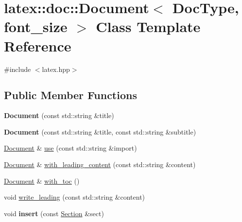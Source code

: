 \hypertarget{classlatex_1_1doc_1_1Document}{\section{latex\-:\-:doc\-:\-:Document$<$ Doc\-Type, font\-\_\-size $>$ Class Template Reference}
\label{classlatex_1_1doc_1_1Document}
}


{\ttfamily \#include $<$latex.\-hpp$>$}

\subsection*{Public Member Functions}
\begin{DoxyCompactItemize}
\item 
\hypertarget{classlatex_1_1doc_1_1Document_abe9dfc667f859b4d5a9b70db123f8de2}{{\bfseries Document} (const std\-::string \&title)}\label{classlatex_1_1doc_1_1Document_abe9dfc667f859b4d5a9b70db123f8de2}

\item 
\hypertarget{classlatex_1_1doc_1_1Document_a9ff60fad527ea2468379e753b8b97ca8}{{\bfseries Document} (const std\-::string \&title, const std\-::string \&subtitle)}\label{classlatex_1_1doc_1_1Document_a9ff60fad527ea2468379e753b8b97ca8}

\item 
\hyperlink{classlatex_1_1doc_1_1Document}{Document} \& \hyperlink{classlatex_1_1doc_1_1Document_a42ec00b493c10efbdc26fa819ed2afaa}{use} (const std\-::string \&import)
\item 
\hyperlink{classlatex_1_1doc_1_1Document}{Document} \& \hyperlink{classlatex_1_1doc_1_1Document_a00e011c7d8b95bf6ca19b8d84f952d9c}{with\-\_\-leading\-\_\-content} (const std\-::string \&content)
\item 
\hyperlink{classlatex_1_1doc_1_1Document}{Document} \& \hyperlink{classlatex_1_1doc_1_1Document_a49d41a602f8cdbb3f2818fa51097952e}{with\-\_\-toc} ()
\item 
void \hyperlink{classlatex_1_1doc_1_1Document_a4b3581e5d02b9d7de9386ebc520b780c}{write\-\_\-leading} (const std\-::string \&content)
\item 
\hypertarget{classlatex_1_1doc_1_1Document_ad86e8242327ce3154f454d8f1f384878}{void {\bfseries insert} (const \hyperlink{classlatex_1_1doc_1_1Section}{Section} \&sect)}\label{classlatex_1_1doc_1_1Document_ad86e8242327ce3154f454d8f1f384878}


\end{DoxyCompactItemize}

